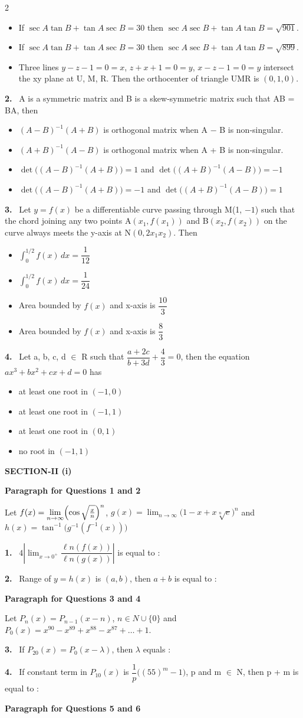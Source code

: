 \documentclass[10pt]{extarticle}
\newcommand{\sect}[1]{\par\smallskip\noindent\textbf{#1}\par}
\newcommand{\qn}[1]{\par\smallskip\noindent\textbf{#1.}~}
\newcommand{\paraq}[2]{\par\smallskip\noindent\textbf{Paragraph for Questions #1 and #2}\par}
\newenvironment{qoptions}{\begin{itemize}[leftmargin=1.8em,itemsep=1pt,topsep=2pt,label={}]}{\end{itemize}}
\newcommand{\opt}[2]{\item[(#1)] #2}
\begin{document}
\begin{multicols}{2}
\begin{qoptions}
\opt{B}{If $\sec A\tan B+\tan A\sec B=30$ then $\sec A\sec B+\tan A\tan B=\sqrt{901}$.}
\opt{C}{If $\sec A\tan B+\tan A\sec B=30$ then $\sec A\sec B+\tan A\tan B=\sqrt{899}$.}
\opt{D}{Three lines $y-z-1=0=x$, $z+x+1=0=y$, $x-z-1=0=y$ intersect the xy plane at U, M, R. Then the orthocenter of triangle UMR is $(0,1,0)$.}
\end{qoptions}
\qn{2} A is a symmetric matrix and B is a skew-symmetric matrix such that AB = BA, then
\begin{qoptions}
\opt{A}{$(A-B)^{-1}(A+B)$ is orthogonal matrix when A $-$ B is non-singular.}
\opt{B}{$(A+B)^{-1}(A-B)$ is orthogonal matrix when A + B is non-singular.}
\opt{C}{$\det\bigl((A-B)^{-1}(A+B)\bigr)=1$ and $\det\bigl((A+B)^{-1}(A-B)\bigr)=-1$}
\opt{D}{$\det\bigl((A-B)^{-1}(A+B)\bigr)=-1$ and $\det\bigl((A+B)^{-1}(A-B)\bigr)=1$}
\end{qoptions}
\qn{3} Let $y=f(x)$ be a differentiable curve passing through M(1, $-1$) such that the chord joining any two points A$(x_1,f(x_1))$ and B$(x_2,f(x_2))$ on the curve always meets the y-axis at N$(0,2x_1x_2)$. Then
\begin{qoptions}
\opt{A}{$\displaystyle\int_0^{1/2}f(x)\,dx=\dfrac1{12}$}
\opt{B}{$\displaystyle\int_0^{1/2}f(x)\,dx=\dfrac1{24}$}
\opt{C}{Area bounded by $f(x)$ and x-axis is $\dfrac{10}3$}
\opt{D}{Area bounded by $f(x)$ and x-axis is $\dfrac83$}
\end{qoptions}
\qn{4} Let a, b, c, d $\in$ R such that $\dfrac{a+2c}{b+3d}+\dfrac43=0$, then the equation $ax^3+bx^2+cx+d=0$ has
\begin{qoptions}
\opt{A}{at least one root in $(-1,0)$}
\opt{B}{at least one root in $(-1,1)$}
\opt{C}{at least one root in $(0,1)$}
\opt{D}{no root in $(-1,1)$}
\end{qoptions}
\sect{SECTION-II (i)}
\paraq{1}{2}
Let $f(x)=\displaystyle\lim_{n\to\infty}\Bigl(\cos\sqrt{\tfrac xn}\Bigr)^n$, $g(x)=\displaystyle\lim_{n\to\infty}\bigl(1-x+x\sqrt[n]{e}\bigr)^n$ and $h(x)=\tan^{-1}\bigl(g^{-1}(f^{-1}(x))\bigr)$\par
\qn{1} $4\left|\displaystyle\lim_{x\to0^+}\dfrac{\ell n(f(x))}{\ell n(g(x))}\right|$ is equal to :
\qn{2} Range of $y=h(x)$ is $(a,b)$, then $a+b$ is equal to :
\paraq{3}{4}
Let $P_n(x)=P_{n-1}(x-n)$, $n\in N\cup\{0\}$ and $P_0(x)=x^{90}-x^{89}+x^{88}-x^{87}+\ldots+1$.\par
\qn{3} If $P_{20}(x)=P_0(x-\lambda)$, then $\lambda$ equals :
\qn{4} If constant term in $P_{10}(x)$ is $\dfrac1p\bigl((55)^m-1\bigr)$, p and m $\in$ N, then p + m is equal to :
\paraq{5}{6}

\end{multicols}
\end{document}

